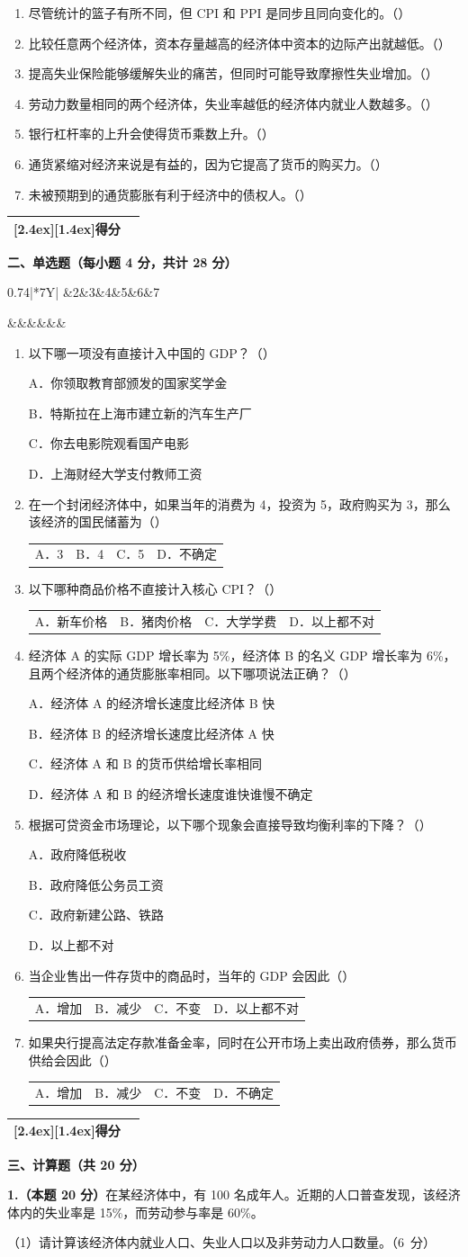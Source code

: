 \documentclass[UTF8,11pt,a4paper,fontset=fandol]{ctexart}
\makeatletter
\newcommand{\scoretitle}[1]{%
  \noindent\begin{tabular}{|c|c|}\hline
  \raisebox{0pt}[2.4ex][1.4ex]{\bfseries 得分} & \makebox[1.15cm]{} \\ \hline
  \end{tabular}\hspace{1em}\textbf{#1}\par\vspace{0.6em}}
\newcommand{\mcgrid}{%
  \begin{center}\begin{tabularx}{0.74\linewidth}{|*{7}{Y|}}
  \hline 1&2&3&4&5&6&7 \\ \hline
  \rule{0pt}{2.25em} &&&&&& \\ \hline
  \end{tabularx}\end{center}}
\newcommand{\tfitem}[1]{\item #1\nobreak\hfill（\qquad）}
\newcommand{\fourchoices}[4]{%
  \par\nopagebreak\begin{tabularx}{\linewidth}{@{}XXXX@{}}
  A．#1 & B．#2 & C．#3 & D．#4
  \end{tabularx}\par}
\newcommand{\choice}[1]{\par\nopagebreak #1}
\makeatother
\begin{document}
\begin{enumerate}[label=\arabic*.,start=4,leftmargin=*,itemsep=2.2em,topsep=0.6em]
\tfitem{尽管统计的篮子有所不同，但 CPI 和 PPI 是同步且同向变化的。}
\tfitem{比较任意两个经济体，资本存量越高的经济体中资本的边际产出就越低。}
\tfitem{提高失业保险能够缓解失业的痛苦，但同时可能导致摩擦性失业增加。}
\tfitem{劳动力数量相同的两个经济体，失业率越低的经济体内就业人数越多。}
\tfitem{银行杠杆率的上升会使得货币乘数上升。}
\tfitem{通货紧缩对经济来说是有益的，因为它提高了货币的购买力。}
\tfitem{未被预期到的通货膨胀有利于经济中的债权人。}
\end{enumerate}
\newpage
\scoretitle{二、单选题（每小题 4 分，共计 28 分）}
\mcgrid
\begin{enumerate}[label=\arabic*.,leftmargin=*,itemsep=0.55em,topsep=0em]
\item 以下哪一项没有直接计入中国的 GDP？（\qquad）
\choice{A．你领取教育部颁发的国家奖学金}
\choice{B．特斯拉在上海市建立新的汽车生产厂}
\choice{C．你去电影院观看国产电影}
\choice{D．上海财经大学支付教师工资}
\item 在一个封闭经济体中，如果当年的消费为 4，投资为 5，政府购买为 3，那么该经济的国民储蓄为（\qquad）
\fourchoices{3}{4}{5}{不确定}
\item 以下哪种商品价格不直接计入核心 CPI？（\qquad）
\fourchoices{新车价格}{猪肉价格}{大学学费}{以上都不对}
\item 经济体 A 的实际 GDP 增长率为 5\%，经济体 B 的名义 GDP 增长率为 6\%，且两个经济体的通货膨胀率相同。以下哪项说法正确？（\qquad）
\choice{A．经济体 A 的经济增长速度比经济体 B 快}
\choice{B．经济体 B 的经济增长速度比经济体 A 快}
\choice{C．经济体 A 和 B 的货币供给增长率相同}
\choice{D．经济体 A 和 B 的经济增长速度谁快谁慢不确定}
\item 根据可贷资金市场理论，以下哪个现象会直接导致均衡利率的下降？（\qquad）
\choice{A．政府降低税收}
\choice{B．政府降低公务员工资}
\choice{C．政府新建公路、铁路}
\choice{D．以上都不对}
\item 当企业售出一件存货中的商品时，当年的 GDP 会因此（\qquad）
\fourchoices{增加}{减少}{不变}{以上都不对}
\item 如果央行提高法定存款准备金率，同时在公开市场上卖出政府债券，那么货币供给会因此（\qquad）
\fourchoices{增加}{减少}{不变}{不确定}
\end{enumerate}
\newpage
\scoretitle{三、计算题（共 20 分）}
\textbf{1.（本题 20 分）}在某经济体中，有 100 名成年人。近期的人口普查发现，该经济体内的失业率是 15\%，而劳动参与率是 60\%。

（1）请计算该经济体内就业人口、失业人口以及非劳动力人口数量。\mbox{（6 分）}
\end{document}
